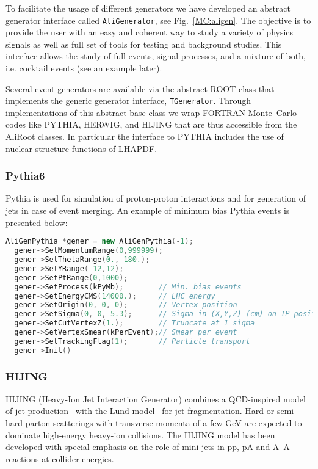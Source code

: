 \documentclass[12pt,a4paper,twoside]{article}
\makeatletter
\newcommand {\MC} {Monte~Carlo\@\xspace}
\makeatother
\begin{document}
To facilitate the usage of different generators we have developed
an abstract generator interface called \texttt{AliGenerator}, see
Fig.~\ref{MC:aligen}.  The objective is to provide the user with
an easy and coherent way to study a variety of physics signals as
well as full set of tools for testing and background studies. This
interface allows the study of full events, signal processes, and
a mixture of both, i.e. cocktail events (see an example later).

Several event generators are available via the abstract ROOT class
that implements the generic generator interface, \texttt{TGenerator}.
Through implementations of this abstract base class we wrap
FORTRAN \MC codes like PYTHIA, HERWIG, and HIJING that are
thus accessible from the AliRoot classes. In particular the
interface to PYTHIA includes the use of nuclear structure
functions of LHAPDF.


\subsubsection{Pythia6}

Pythia is used for simulation of proton-proton interactions and for
generation of jets in case of event merging. An example of minimum
bias Pythia events is presented below:

\begin{lstlisting}[language=C++]
  AliGenPythia *gener = new AliGenPythia(-1); 
  gener->SetMomentumRange(0,999999);
  gener->SetThetaRange(0., 180.);
  gener->SetYRange(-12,12);
  gener->SetPtRange(0,1000);
  gener->SetProcess(kPyMb);        // Min. bias events
  gener->SetEnergyCMS(14000.);     // LHC energy
  gener->SetOrigin(0, 0, 0);       // Vertex position
  gener->SetSigma(0, 0, 5.3);      // Sigma in (X,Y,Z) (cm) on IP position
  gener->SetCutVertexZ(1.);        // Truncate at 1 sigma
  gener->SetVertexSmear(kPerEvent);// Smear per event
  gener->SetTrackingFlag(1);       // Particle transport
  gener->Init()
\end{lstlisting}


\subsubsection{HIJING}
HIJING (Heavy-Ion Jet Interaction Generator) combines a
QCD-inspired model of jet production~\cite{MC:HIJING} with the
Lund model~\cite{MC:LUND} for jet fragmentation.  Hard or
semi-hard parton scatterings with transverse momenta of a few GeV
are expected to dominate high-energy heavy-ion collisions.  The
HIJING model has been developed with special emphasis on the role
of mini jets in pp, pA and A--A reactions at collider energies.
\end{document}

